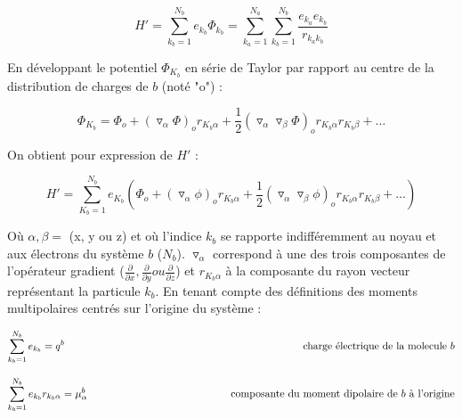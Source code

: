 	\begin{equation}
	H' = \sum_{k_{b}=1}^{N_{b}} e_{k_{b}} \Phi_{k_{b}} = \sum_{k_{a}=1}^{N_{a}} \sum_{k_{b}=1}^{N_{b}} \frac{e_{k_{a}} e_{k_{b}}}{r_{k_{a}k_{b}}}
	\end{equation}
	
	En développant le potentiel $\Phi_{K_{b}}$ en série de Taylor par rapport au centre de la distribution de charges de $b$ (noté "o") :
	
	\begin{equation}
	\Phi_{K_{b}} = \Phi_{o} + (\triangledown_{\alpha} \Phi)_{o} r_{K_{b}\alpha} + \frac{1}{2} (\triangledown_{\alpha} \triangledown_{\beta} \Phi)_{o} r_{K_{b}\alpha} r_{K_{b}\beta} + \ldots
	\end{equation}
	
	On obtient pour expression de $H'$ : 
	
	\begin{equation}
	H' = \sum_{K_{b}=1}^{N_{b}} e_{K_{b}} \left(\Phi_{o} + (\triangledown_{\alpha} \phi)_{o} r_{K_{b}\alpha} + \frac{1}{2}(\triangledown_{\alpha} \triangledown_{\beta}\phi)_{o} r_{K_{b}\alpha} r_{K_{b}\beta} + \ldots \right)
	\end{equation}
	
	Où $\alpha,\beta=$ (x, y ou z) et où l'indice $k_{b}$ se rapporte indifféremment au noyau et aux électrons du système $b$ ($N_{b}$). $\triangledown_{\alpha}$ correspond à une des trois composantes de l'opérateur gradient ($\frac{\partial}{\partial x}, \frac{\partial}{\partial y} ou \frac{\partial}{\partial z}$) et $r_{K_{b}\alpha}$ à la composante du rayon vecteur représentant la particule $k_{b}$. En tenant compte des définitions des moments multipolaires centrés sur l'origine du système : 
	
	\begin{flushleft}
		\begin{equation*}
		\sum_{k_{b}=1}^{N_{b}} e_{k_{b}} = q^{b} \hspace{8.1cm}\textup{charge électrique de la molecule $b$}     
		\end{equation*}
	\end{flushleft}
	
	\begin{flushleft}
		\begin{equation*}
		\sum_{k_{b}=1}^{N_{b}} e_{k_{b}} r_{k_{b}\alpha} = \mu_{\alpha}^{b}  \hspace{4.8cm} \textup{composante du moment dipolaire de $b$ à l'origine}
		\end{equation*}
	\end{flushleft}
	

